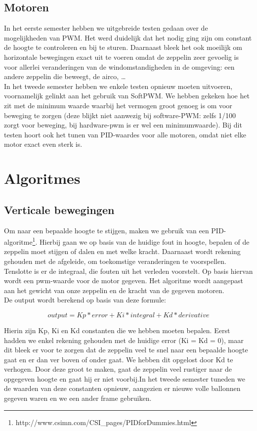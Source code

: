 \documentclass[eind]{penoverslag}
\begin{document}
\subsection{Motoren}
In het eerste semester hebben we uitgebreide testen gedaan over de mogelijkheden van PWM. Het werd duidelijk dat het nodig ging zijn om constant de hoogte te controleren en bij te sturen. Daarnaast bleek het ook moeilijk om horizontale bewegingen exact uit te voeren omdat de zeppelin zeer gevoelig is voor allerlei veranderingen van de windomstandigheden in de omgeving: een andere zeppelin die beweegt, de airco, \ldots \\

In het tweede semester hebben we enkele testen opnieuw moeten uitvoeren, voornamelijk gelinkt aan het gebruik van SoftPWM. We hebben gekeken hoe het zit met de minimum waarde waarbij het vermogen groot genoeg is om voor beweging te zorgen (deze blijkt niet aanwezig bij software-PWM: zelfs 1/100 zorgt voor beweging, bij hardware-pwm is er wel een minimumwaarde). Bij dit testen hoort ook het tunen van PID-waardes voor alle motoren, omdat niet elke motor exact even sterk is. \\

\section{Algoritmes}
\subsection{Verticale bewegingen}
Om naar een bepaalde hoogte te stijgen, maken we gebruik van een PID-algoritme\footnote{http://www.csimn.com/CSI\_pages/PIDforDummies.html}. Hierbij gaan we op basis van de huidige fout in hoogte, bepalen of de zeppelin moet stijgen of dalen en met welke kracht. Daarnaast wordt rekening gehouden met de afgeleide, om toekomstige veranderingen te voorspellen. Tenslotte is er de integraal, die fouten uit het verleden voorstelt. Op basis hiervan wordt een pwm-waarde voor de motor gegeven. Het algoritme wordt aangepast aan het gewicht van onze zeppelin en de kracht van de gegeven motoren. \\
De output wordt berekend op basis van deze formule:

\begin{equation}
 output = Kp*error + Ki*integral + Kd*derivative
 \label{PID}
\end{equation}

Hierin zijn Kp, Ki en Kd constanten die we hebben moeten bepalen. Eerst hadden we enkel rekening gehouden met de huidige error (Ki = Kd = 0), maar dit bleek er voor te zorgen dat de zeppelin veel te snel naar een bepaalde hoogte gaat en er dan ver boven of onder gaat. We hebben dit opgelost door Kd te verhogen. Door deze groot te maken, gaat de zeppelin veel rustiger naar de opgegeven hoogte en gaat hij er niet voorbij.In het tweede semester tuneden we de waarden van deze constanten opnieuw, aangezien er nieuwe volle ballonnen gegeven waren en we een ander frame gebruiken. \\
\end{document}
